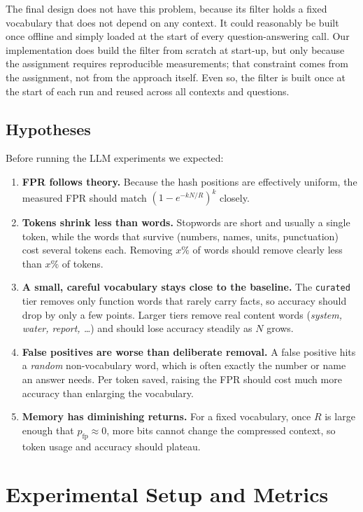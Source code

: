 \documentclass[11pt]{article}
\newcommand{\code}[1]{\texttt{#1}}
\newcommand{\pfp}{p_{\mathrm{fp}}}
\begin{document}
The final design does not have this problem, because its filter holds a fixed vocabulary that does
not depend on any context. It could reasonably be built once offline and simply loaded at the start
of every question-answering call. Our implementation does build the filter from scratch at start-up,
but only because the assignment requires reproducible measurements; that constraint comes from the
assignment, not from the approach itself. Even so, the filter is built once at the start of each run
and reused across all contexts and questions.

\subsection{Hypotheses}
Before running the LLM experiments we expected:
\begin{enumerate}[label=\textbf{H\arabic*}]
  \item \textbf{FPR follows theory.} Because the hash positions are effectively uniform, the
        measured FPR should match $(1-e^{-kN/R})^k$ closely.
  \item \textbf{Tokens shrink less than words.} Stopwords are short and usually a single token,
        while the words that survive (numbers, names, units, punctuation) cost several tokens each.
        Removing $x\%$ of words should remove clearly less than $x\%$ of tokens.
  \item \textbf{A small, careful vocabulary stays close to the baseline.} The \code{curated} tier
        removes only function words that rarely carry facts, so accuracy should drop by only a few
        points. Larger tiers remove real content words (\emph{system, water, report, \dots}) and
        should lose accuracy steadily as $N$ grows.
  \item \textbf{False positives are worse than deliberate removal.} A false positive hits a
        \emph{random} non-vocabulary word, which is often exactly the number or name an answer needs.
        Per token saved, raising the FPR should cost much more accuracy than enlarging the vocabulary.
  \item \textbf{Memory has diminishing returns.} For a fixed vocabulary, once $R$ is large enough
        that $\pfp\approx 0$, more bits cannot change the compressed context, so token usage and
        accuracy should plateau.
\end{enumerate}

\section{Experimental Setup and Metrics}
\label{sec:setup}
\end{document}
